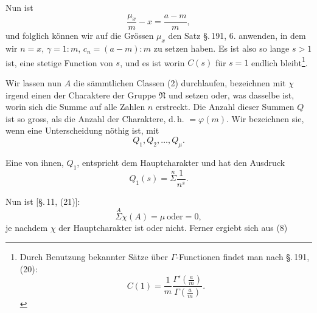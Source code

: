 
Nun ist
\[
\frac{\mu_x}{m} - x = \frac{a-m}{m},
\]
und folglich können wir auf die Grössen $\mu_x$ den Satz \S.\,191, 6.
anwenden, in dem wir $n = x$, $\gamma = 1:m$, $c_n = (a-m):m$ zu setzen
haben. Es ist also
so lange $s > 1$ ist, eine stetige Function von $s$, und es ist
worin $C(s)$ für $s=1$ endlich bleibt\footnote{Durch Benutzung bekannter
Sätze über $\Gamma$-Functionen findet man nach \S.\,191, (20):
\[
C(1) = \frac{1}{m} \frac{\Gamma'\left(\frac{a}{m}\right)}{\Gamma\left(\frac{a}{m}\right)}.
\]}.

Wir lassen nun $A$ die sämmtlichen Classen (2) durchlaufen, bezeichnen mit
$\chi$ irgend einen der Charaktere der Gruppe $\mathfrak{N}$ und setzen
oder, was dasselbe ist,
worin sich die Summe auf alle Zahlen $n$ erstreckt. Die Anzahl dieser Summen
$Q$ ist so gross, als die Anzahl der Charaktere, d.\,h. $= \varphi(m)$. Wir
bezeichnen sie, wenn eine Unterscheidung nöthig ist, mit
\[
Q_1, Q_2, \ldots, Q_\mu.
\]

Eine von ihnen, $Q_1$, entspricht dem Hauptcharakter und hat den Ausdruck
\[
Q_1(s) = \overset{n}{\Sigma} \frac{1}{n^s}.
\]

Nun ist [\S.\,11, (21)]:
\[
\overset{A}{\Sigma} \chi(A) = \mu \ \text{oder} = 0,
\]
je nachdem $\chi$ der Hauptcharakter ist oder nicht. Ferner ergiebt sich aus
(8)
